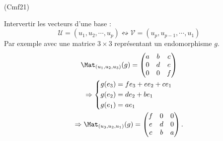 \begin{tiny}(Cmf21)\end{tiny} Intervertir les vecteurs d'une base :
\[
  \mathcal{U} = (u_1,u_2,\cdots,u_p)\leftrightsquigarrow \mathcal{V} = (u_p,u_{p-1},\cdots,u_1)
\]
Par exemple avec une matrice $3\times3$ représentant un endomorphisme $g$.
\begin{multline*}
\Mat_{(u_1,u_2,u_3)}(g)=
\begin{pmatrix}
    a & b & c \\ 0 & d & e \\ 0 & 0 & f 
  \end{pmatrix} \\
  \Rightarrow
\left\lbrace
\begin{aligned}
  g(e_3) &= fe_3 + ee_2 + ce_1 \\ g(e_2) &= de_2 + b e_1 \\ g(e_1) &= ae_1 
\end{aligned}
\right. \\
\Rightarrow 
\Mat_{(u_3,u_2,u_1)}(g) =
\begin{pmatrix}
    f & 0 & 0 \\ e & d & 0 \\ c & b & a 
  \end{pmatrix} .
\end{multline*}
